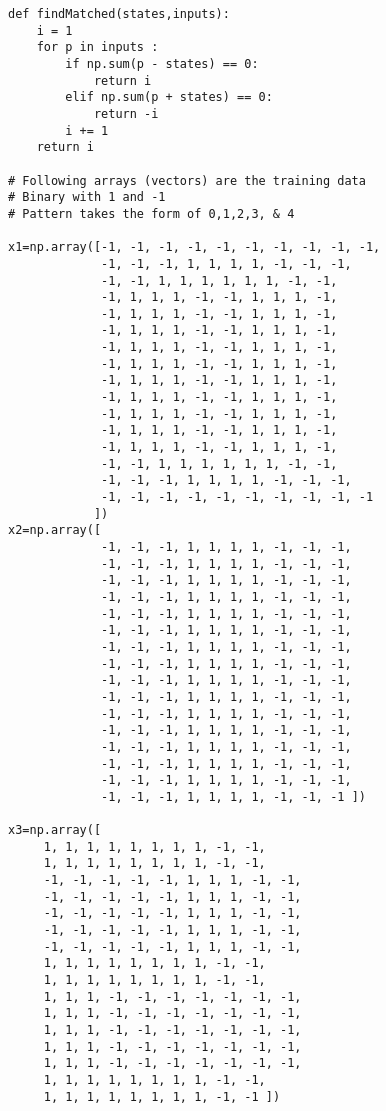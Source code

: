 \documentclass{article}
\begin{document}
\begin{verbatim}
def findMatched(states,inputs):
    i = 1
    for p in inputs :
        if np.sum(p - states) == 0:
            return i
        elif np.sum(p + states) == 0:
            return -i
        i += 1
    return i 
        
# Following arrays (vectors) are the training data
# Binary with 1 and -1
# Pattern takes the form of 0,1,2,3, & 4

x1=np.array([-1, -1, -1, -1, -1, -1, -1, -1, -1, -1,
             -1, -1, -1, 1, 1, 1, 1, -1, -1, -1,
             -1, -1, 1, 1, 1, 1, 1, 1, -1, -1,
             -1, 1, 1, 1, -1, -1, 1, 1, 1, -1,
             -1, 1, 1, 1, -1, -1, 1, 1, 1, -1,
             -1, 1, 1, 1, -1, -1, 1, 1, 1, -1,
             -1, 1, 1, 1, -1, -1, 1, 1, 1, -1,
             -1, 1, 1, 1, -1, -1, 1, 1, 1, -1,
             -1, 1, 1, 1, -1, -1, 1, 1, 1, -1,
             -1, 1, 1, 1, -1, -1, 1, 1, 1, -1,
             -1, 1, 1, 1, -1, -1, 1, 1, 1, -1,
             -1, 1, 1, 1, -1, -1, 1, 1, 1, -1,
             -1, 1, 1, 1, -1, -1, 1, 1, 1, -1,
             -1, -1, 1, 1, 1, 1, 1, 1, -1, -1,
             -1, -1, -1, 1, 1, 1, 1, -1, -1, -1,
             -1, -1, -1, -1, -1, -1, -1, -1, -1, -1
            ])
x2=np.array([
             -1, -1, -1, 1, 1, 1, 1, -1, -1, -1,
             -1, -1, -1, 1, 1, 1, 1, -1, -1, -1,
             -1, -1, -1, 1, 1, 1, 1, -1, -1, -1,
             -1, -1, -1, 1, 1, 1, 1, -1, -1, -1,
             -1, -1, -1, 1, 1, 1, 1, -1, -1, -1,
             -1, -1, -1, 1, 1, 1, 1, -1, -1, -1,
             -1, -1, -1, 1, 1, 1, 1, -1, -1, -1,
             -1, -1, -1, 1, 1, 1, 1, -1, -1, -1,
             -1, -1, -1, 1, 1, 1, 1, -1, -1, -1,
             -1, -1, -1, 1, 1, 1, 1, -1, -1, -1,
             -1, -1, -1, 1, 1, 1, 1, -1, -1, -1,
             -1, -1, -1, 1, 1, 1, 1, -1, -1, -1,
             -1, -1, -1, 1, 1, 1, 1, -1, -1, -1,
             -1, -1, -1, 1, 1, 1, 1, -1, -1, -1,
             -1, -1, -1, 1, 1, 1, 1, -1, -1, -1,
             -1, -1, -1, 1, 1, 1, 1, -1, -1, -1 ])

x3=np.array([
     1, 1, 1, 1, 1, 1, 1, 1, -1, -1,
     1, 1, 1, 1, 1, 1, 1, 1, -1, -1,
     -1, -1, -1, -1, -1, 1, 1, 1, -1, -1,
     -1, -1, -1, -1, -1, 1, 1, 1, -1, -1,
     -1, -1, -1, -1, -1, 1, 1, 1, -1, -1,
     -1, -1, -1, -1, -1, 1, 1, 1, -1, -1,
     -1, -1, -1, -1, -1, 1, 1, 1, -1, -1,
     1, 1, 1, 1, 1, 1, 1, 1, -1, -1,
     1, 1, 1, 1, 1, 1, 1, 1, -1, -1,
     1, 1, 1, -1, -1, -1, -1, -1, -1, -1,
     1, 1, 1, -1, -1, -1, -1, -1, -1, -1,
     1, 1, 1, -1, -1, -1, -1, -1, -1, -1,
     1, 1, 1, -1, -1, -1, -1, -1, -1, -1,
     1, 1, 1, -1, -1, -1, -1, -1, -1, -1,
     1, 1, 1, 1, 1, 1, 1, 1, -1, -1,
     1, 1, 1, 1, 1, 1, 1, 1, -1, -1 ])


\end{verbatim}
\end{document}
